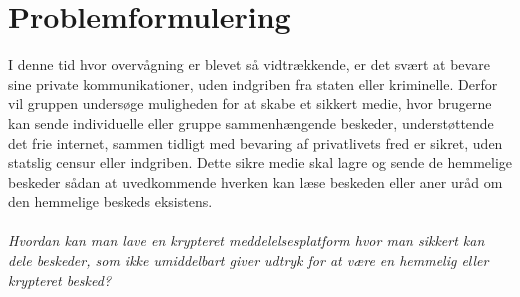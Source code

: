 \section{Problemformulering}
I denne tid hvor overvågning er blevet så vidtrækkende, er det svært at bevare sine private kommunikationer, uden indgriben fra staten eller kriminelle. Derfor vil gruppen undersøge muligheden for at skabe et sikkert medie, hvor brugerne kan sende individuelle eller gruppe sammenhængende beskeder, understøttende det frie internet, sammen tidligt med bevaring af privatlivets fred er sikret, uden statslig censur eller indgriben. Dette sikre medie skal lagre og sende de hemmelige beskeder sådan at uvedkommende hverken kan læse beskeden eller aner uråd om den hemmelige beskeds eksistens.
\\\\
\textit{Hvordan kan man lave en krypteret meddelelsesplatform hvor man sikkert kan dele beskeder, som ikke umiddelbart giver udtryk for at være en hemmelig eller krypteret besked?}